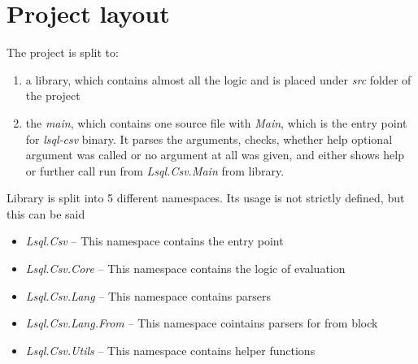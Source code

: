 \section{Project layout}

The project is split to:
\begin{enumerate}
  \item a library, which contains almost all the logic and is placed under
       \textit{src} folder of the project

  \item the \textit{main}, which contains one source file
      with \textit{Main}, which is the entry point for \textit{lsql-csv} binary. 
      It parses the arguments, checks, whether help optional argument was called or no argument at all was given, 
      and either shows help or further call run from \textit{Lsql.Csv.Main} from library.
\end{enumerate}

Library is split into 5 different namespaces. Its usage is not strictly defined, but this can be said
\begin{itemize}
    \item \textit{Lsql.Csv} -- This namespace contains the entry point
    \item \textit{Lsql.Csv.Core} -- This namespace contains the logic of evaluation
    \item \textit{Lsql.Csv.Lang} -- This namespace contains parsers
    \item \textit{Lsql.Csv.Lang.From} -- This namespace cointains parsers for from block
    \item \textit{Lsql.Csv.Utils} -- This namespace contains helper functions
\end{itemize}

